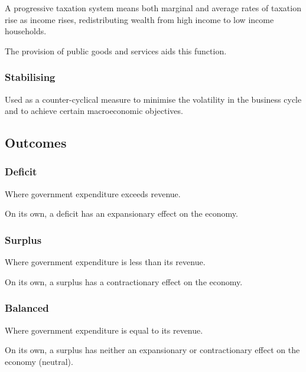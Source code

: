 \documentclass[a4paper,11pt]{article}
\begin{document}
A progressive taxation system means both marginal and average rates of taxation
rise as income rises, redistributing wealth from high income to low income
households.

The provision of public goods and services aids this function.

\subsubsection{Stabilising}

Used as a counter-cyclical measure to minimise the volatility in the business
cycle and to achieve certain macroeconomic objectives.

\subsection{Outcomes}

\subsubsection{Deficit}

Where government expenditure exceeds revenue.

On its own, a deficit has an expansionary effect on the economy.

\subsubsection{Surplus}

Where government expenditure is less than its revenue.

On its own, a surplus has a contractionary effect on the economy.

\subsubsection{Balanced}

Where government expenditure is equal to its revenue.

On its own, a surplus has neither an expansionary or contractionary effect on
the economy (neutral).
\end{document}
